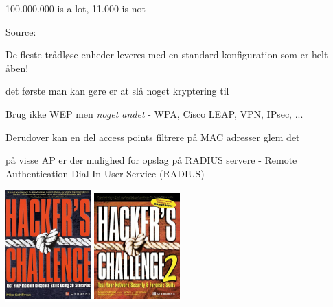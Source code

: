 \documentclass[20pt,landscape,a4paper,footrule]{foils}
\begin{document}

\centerline{100.000.000 is a lot, 11.000 is not}

Source:\\










\begin{list1}
\item De fleste trådløse enheder leveres med en standard
  konfiguration som er helt åben!
\item det første man kan gøre er at slå noget kryptering til
\item Brug ikke WEP men \emph{noget andet} - WPA, Cisco LEAP, VPN,
  IPsec, ...
\item Derudover kan en del access points filtrere på MAC adresser glem
  det
\item på visse AP er der mulighed for opslag på RADIUS servere -
  Remote Authentication Dial In User Service (RADIUS)
\end{list1}





\begin{center}
\colorbox{white}{
\includegraphics[width=33mm]{images/hackers-challenge.jpg}
\includegraphics[width=33mm]{images/hackers-challenge2.jpg}}
\end{center}
\end{document}
